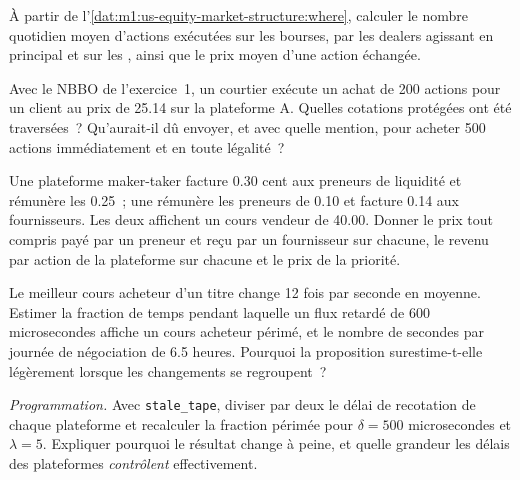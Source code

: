 \begin{exercise}[$\star$]\label{exo:m1:us-equity-market-structure:3}
À partir de l'\cref{dat:m1:us-equity-market-structure:where}, calculer le nombre quotidien moyen
d'actions exécutées sur les bourses, par les dealers agissant en principal et sur les , ainsi que le prix moyen d'une action échangée.
\end{exercise}

\begin{exercise}[$\star\star$]\label{exo:m1:us-equity-market-structure:4}
Avec le NBBO de l'exercice~1, un courtier exécute un achat de 200 actions pour
un client au prix de 25.14 sur la plateforme A. Quelles cotations protégées ont été traversées~?
Qu'aurait-il dû envoyer, et avec quelle mention, pour acheter 500 actions immédiatement et
en toute légalité~?
\end{exercise}

\begin{exercise}[$\star\star$]\label{exo:m1:us-equity-market-structure:5}
Une plateforme maker-taker facture 0.30 cent aux preneurs de liquidité et rémunère les  0.25~; une  rémunère les preneurs de 0.10 et facture 0.14 aux
fournisseurs. Les deux affichent un cours vendeur de 40.00. Donner le prix tout compris payé par un
preneur et reçu par un fournisseur sur chacune, le revenu par action de la plateforme sur chacune et le prix de la priorité.
\end{exercise}

\begin{exercise}[$\star\star$]\label{exo:m1:us-equity-market-structure:6}
Le meilleur cours acheteur d'un titre change 12 fois par seconde en moyenne. Estimer la fraction de
temps pendant laquelle un flux retardé de 600 microsecondes affiche un cours acheteur périmé, et
le nombre de secondes par journée de négociation de 6.5 heures. Pourquoi la proposition surestime-t-elle
légèrement lorsque les changements se regroupent~?
\end{exercise}

\begin{exercise}[$\star\star\star$]\label{exo:m1:us-equity-market-structure:7}
\emph{Programmation.} Avec \texttt{stale\_tape}, diviser par deux le délai de recotation de chaque
plateforme et recalculer la fraction périmée pour $\delta = 500$ microsecondes et $\lambda =
5$. Expliquer pourquoi le résultat change à peine, et quelle grandeur les délais des plateformes
\emph{contrôlent} effectivement.
\end{exercise}

